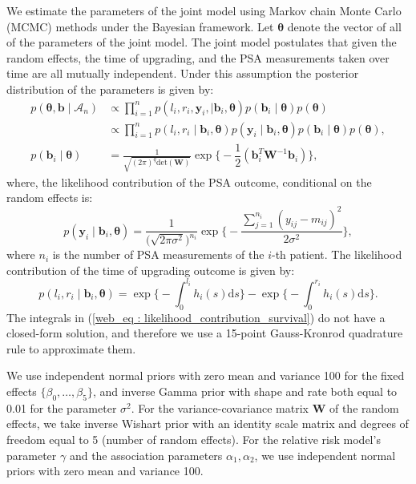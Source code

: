 We estimate the parameters of the joint model using Markov chain Monte Carlo (MCMC) methods under the Bayesian framework. Let $\boldsymbol{\theta}$ denote the vector of all of the parameters of the joint model. The joint model postulates that given the random effects, the time of upgrading, and the PSA measurements taken over time are all mutually independent. Under this assumption the posterior distribution of the parameters is given by:
\begin{align*}
p(\boldsymbol{\theta}, \boldsymbol{b} \mid \mathcal{A}_n) & \propto \prod_{i=1}^n p(l_i, r_i, \boldsymbol{y}_{i}, \mid \boldsymbol{b}_i, \boldsymbol{\theta}) p(\boldsymbol{b}_i \mid \boldsymbol{\theta}) p(\boldsymbol{\theta})\\
& \propto \prod_{i=1}^n p(l_i, r_i \mid \boldsymbol{b}_i, \boldsymbol{\theta}) p(\boldsymbol{y}_{i} \mid \boldsymbol{b}_i, \boldsymbol{\theta}) p(\boldsymbol{b}_i \mid \boldsymbol{\theta}) p(\boldsymbol{\theta}),\\
p(\boldsymbol{b}_i \mid \boldsymbol{\theta}) &= \frac{1}{\sqrt{(2 \pi)^q \text{det}(\boldsymbol{W})}} \exp\bigg\{-\dfrac{1}{2}(\boldsymbol{b}_i^T \boldsymbol{W}^{-1} \boldsymbol{b}_i)\bigg\},
\end{align*}
where, the likelihood contribution of the PSA outcome, conditional on the random effects is:
\begin{equation*}
p(\boldsymbol{y}_{i} \mid \boldsymbol{b}_i, \boldsymbol{\theta}) = \frac{1}{\big(\sqrt{2 \pi \sigma^2}\big)^{n_{i}}} \exp\bigg\{-\frac{\sum_{j=1}^{n_i}{({y}_{ij} - {m}_{ij})}^2}{2\sigma^2}\bigg\},
\end{equation*}
where $n_i$ is the number of PSA measurements of the $i$-th patient. The likelihood contribution of the time of upgrading outcome is given by:
\begin{equation}
\label{web_eq : likelihood_contribution_survival}
p(l_i,r_i\mid \boldsymbol{b}_i,\boldsymbol{\theta}) = \exp\Big\{-\int_0^{l_i} h_i(s)\mathrm{d}{s}\Big\} - \exp\Big\{-\int_0^{r_i}h_i(s)\mathrm{d}{s}\Big\}.
\end{equation}
The integrals in (\ref{web_eq : likelihood_contribution_survival}) do not have a closed-form solution, and therefore we use a 15-point Gauss-Kronrod quadrature rule to approximate them.

We use independent normal priors with zero mean and variance 100 for the fixed effects $\{\beta_{0},\ldots,\beta_{5}\}$, and inverse Gamma prior with shape and rate both equal to 0.01 for the parameter $\sigma^2$. For the variance-covariance matrix $\boldsymbol{W}$ of the random effects, we take inverse Wishart prior with an identity scale matrix and degrees of freedom equal to 5 (number of random effects). For the relative risk model's parameter $\gamma$ and the association parameters $\alpha_{1}, \alpha_{2}$, we use independent normal priors with zero mean and variance 100.

